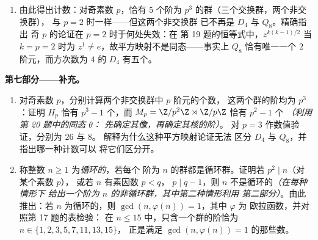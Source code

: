 \begin{problem}
\begin{enumerate}[resume]
{——证明 $Z(G) = \langle r^p\rangle$——并选取 $a$
        使 $s = tr^{a}$ 满足 $s^p = e$；$p$ 为奇数在何处用到
        ？）}。证明 $srs^{-1} = r^{1+p}$ 在将 $s$ 换为
        某个幂之后成立，并由此得出：恰有\emph{一个}
        阶为 $p^3$ 且方次数为 $p^2$ 的非交换群，
        即 $\Z/p^2\Z \rtimes_\varphi \Z/p\Z$，其中
        $\varphi(1)\colon r \mapsto r^{1+p}$\emph{（利用
        第 3 题；$\operatorname{Aut}(\Z/p^2\Z)$ 为循环群，阶为
        $p(p-1)$，在本阶段不加证明地承认，因而它有唯一的
        $p$ 阶子群）}。
  \item 由此得出计数：对奇素数 $p$，恰有 $5$
        个阶为 $p^3$ 的群（三个交换群，两个非交换群），
        与 $p = 2$ 时一样——但这两个非交换群
        已不再是 $D_4$ 与 $Q_8$。精确指出
        奇 $p$ 的论证在 $p = 2$ 时于何处失效：在
        第 19 题的恒等式中，$z^{k(k-1)/2}$ 当 $k = p = 2$ 时为 $z^1 \neq
        e$，故平方映射不是同态——事实上 $Q_8$
        恰有唯一一个 $2$ 阶元，而方次数为 $4$ 的
        $D_4$ 有五个。
\end{enumerate}

\medskip
\noindent\textbf{第七部分——补充。}
\begin{enumerate}[resume]
  \item 对奇素数 $p$，分别计算两个非交换群中 $p$ 阶元的个数，
        这两个群的阶均为 $p^3$：证明
        $H_p$ 恰有 $p^3 - 1$ 个，而 $M_p =
        \Z/p^2\Z \rtimes \Z/p\Z$ 恰有 $p^2 - 1$ 个
        \emph{（利用第 20 题中的同态 $\theta$：
        先确定其像，再确定其核的阶）}。
        对 $p = 3$ 作数值验证，分别为 $26$ 与 $8$。
        解释为什么这种平方映射论证无法
        区分 $D_4$ 与 $Q_8$，并指出哪一种计数可以
        将它们区分开。
  \item 称整数 $n \geq 1$ 为\emph{循环的}，若每个
        阶为 $n$ 的群都是循环群。证明若 $p^2 \mid n$（对某个素数 $p$），
        或若 $n$ 有素因数 $p < q$，
        $p \mid q - 1$，则 $n$ 不是循环的\emph{（在每种情形下
        给出一个阶为 $n$ 的非循环群，其中第二种情形利用
        第二部分）}。由此推出：若 $n$ 为循环的，则
        $\gcd(n, \varphi(n)) = 1$，其中 $\varphi$ 为
        欧拉函数，并对照第 17 题的表检验：
        在 $n \leq 15$ 中，只含一个群的阶恰为
        $n \in \{1, 2, 3, 5, 7, 11, 13, 15\}$，
        正是满足 $\gcd(n, \varphi(n)) = 1$ 的那些数。
\end{enumerate}
\end{problem}
